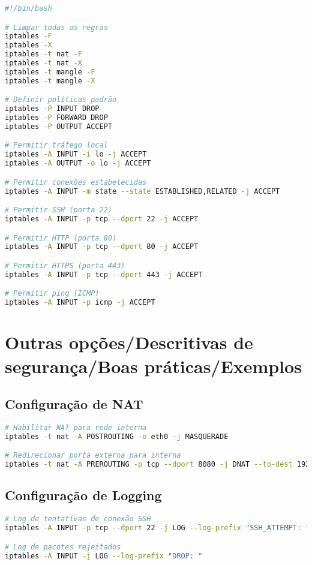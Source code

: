 \documentclass[12pt,fleqn]{article}
\begin{document}
\begin{lstlisting}[language=bash, caption=Configuração básica de firewall]
#!/bin/bash

# Limpar todas as regras
iptables -F
iptables -X
iptables -t nat -F
iptables -t nat -X
iptables -t mangle -F
iptables -t mangle -X

# Definir políticas padrão
iptables -P INPUT DROP
iptables -P FORWARD DROP
iptables -P OUTPUT ACCEPT

# Permitir tráfego local
iptables -A INPUT -i lo -j ACCEPT
iptables -A OUTPUT -o lo -j ACCEPT

# Permitir conexões estabelecidas
iptables -A INPUT -m state --state ESTABLISHED,RELATED -j ACCEPT

# Permitir SSH (porta 22)
iptables -A INPUT -p tcp --dport 22 -j ACCEPT

# Permitir HTTP (porta 80)
iptables -A INPUT -p tcp --dport 80 -j ACCEPT

# Permitir HTTPS (porta 443)
iptables -A INPUT -p tcp --dport 443 -j ACCEPT

# Permitir ping (ICMP)
iptables -A INPUT -p icmp -j ACCEPT
\end{lstlisting}

\section {Outras opções/Descritivas de segurança/Boas práticas/Exemplos}

\subsection{Configuração de NAT}

\begin{lstlisting}[language=bash, caption=Configuração de NAT]
# Habilitar NAT para rede interna
iptables -t nat -A POSTROUTING -o eth0 -j MASQUERADE

# Redirecionar porta externa para interna
iptables -t nat -A PREROUTING -p tcp --dport 8080 -j DNAT --to-dest 192.168.1.100:80
\end{lstlisting}

\subsection{Configuração de Logging}

\begin{lstlisting}[language=bash, caption=Configuração de logs]
# Log de tentativas de conexão SSH
iptables -A INPUT -p tcp --dport 22 -j LOG --log-prefix "SSH_ATTEMPT: "

# Log de pacotes rejeitados
iptables -A INPUT -j LOG --log-prefix "DROP: "
\end{lstlisting}
\end{document}

